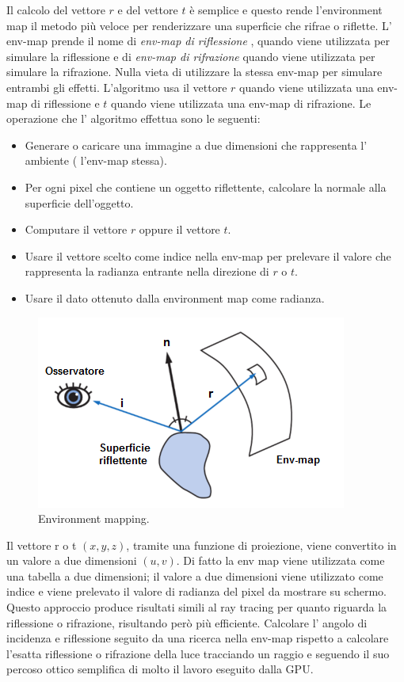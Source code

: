 Il calcolo del vettore $r$ e del vettore $t$ è semplice e questo rende l’environment map il metodo più veloce per renderizzare una superficie che rifrae o riflette.
L’ env-map prende il nome di \emph{env-map di riflessione} , quando viene utilizzata per simulare la riflessione e di \emph{env-map di rifrazione} quando viene utilizzata per simulare la rifrazione. Nulla vieta di utilizzare la stessa env-map per simulare entrambi gli effetti.
L’algoritmo usa il vettore $r$ quando viene utilizzata una env-map di riflessione e $t$ quando viene utilizzata una env-map di rifrazione.
Le operazione che l’ algoritmo effettua sono le seguenti:
\begin{itemize}
\item Generare o caricare una immagine a due dimensioni che rappresenta l’ ambiente ( l’env-map stessa).
\item Per ogni pixel che contiene un oggetto riflettente, calcolare la normale alla superficie dell’oggetto.
\item Computare il vettore $r$ oppure il vettore $t$.
\item Usare il vettore scelto come indice nella env-map per prelevare il valore che rappresenta la radianza entrante nella direzione di $r$ o $t$.
\item Usare il dato ottenuto dalla environment map come radianza. 
\end{itemize}
\begin{figure}[htb]
\centering
\includegraphics[width=0.5\linewidth]{images/chapter_stato_arte/stato_arte_env_alg.png}\hfill
\caption[Algoritmo environment mapping]{Environment mapping.}
\label{fig:stato_arte_env_alg}
\end{figure}

Il vettore r o t $(x,y,z)$, tramite una funzione di proiezione, viene convertito in un valore a due dimensioni $(u,v)$. Di fatto la env map viene utilizzata come una tabella a due dimensioni; il valore a due dimensioni viene utilizzato come indice e viene prelevato il valore di radianza del pixel da mostrare su schermo. 
Questo approccio produce risultati simili al ray tracing per quanto riguarda la riflessione o rifrazione, risultando però  più efficiente. 
Calcolare l’ angolo di incidenza e riflessione seguito da una ricerca nella env-map rispetto a calcolare l’esatta riflessione o rifrazione della luce tracciando un raggio e seguendo il suo percoso ottico semplifica di molto il lavoro eseguito dalla GPU. 

